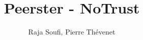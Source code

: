 \documentclass[]{article}
\title{Peerster - NoTrust}
\author{Raja Soufi, Pierre Thévenet}
\begin{document}
\maketitle

\begin{abstract}

\end{abstract}

\section{}
\end{document}
